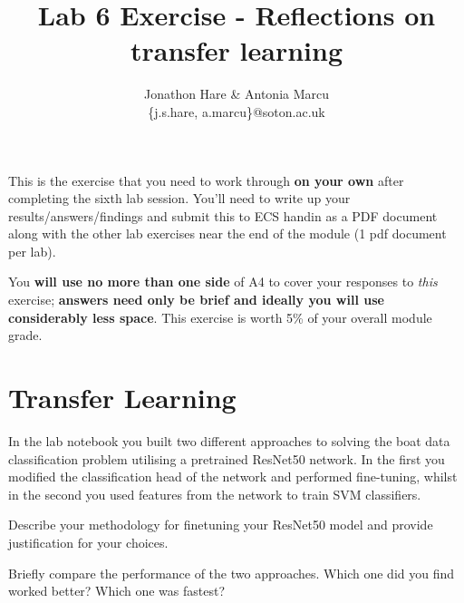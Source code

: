 \documentclass[a4paper]{article}
\begin{document}
\lstset{language=Python,upquote=true}

\setlength{\leftskip}{20pt}
\title{Lab 6 Exercise - Reflections on transfer learning}
\author{Jonathon Hare \& Antonia Marcu\\\{j.s.hare, a.marcu\}@soton.ac.uk}

\maketitle


This is the exercise that you need to work through \textbf{on your own} after completing the sixth lab session. You'll need to write up your results/answers/findings and submit this to ECS handin as a PDF document along with the other lab exercises near the end of the module (1 pdf document per lab). 

You \textbf{will use no more than one side} of A4 to cover your responses to \emph{this} exercise; \textbf{answers need only be brief and ideally you will use considerably less space}. This exercise is worth 5\% of your overall module grade.

\section{Transfer Learning}
In the lab notebook you built two different approaches to solving the boat data classification problem utilising a pretrained ResNet50 network. In the first you modified the classification head of the network and performed fine-tuning, whilst in the second you used features from the network to train SVM classifiers.
\\[1em]
\begin{tcolorbox}[title=Finetuning (2 marks)]
Describe your methodology for finetuning your ResNet50 model and provide justification for your choices.
\end{tcolorbox}
\vspace{1em}
\begin{tcolorbox}[title=Reflect on the two different approaches (3 marks)]
Briefly compare the performance of the two approaches. Which one did you find worked better? Which one was fastest? 
\end{tcolorbox}
\end{document}
